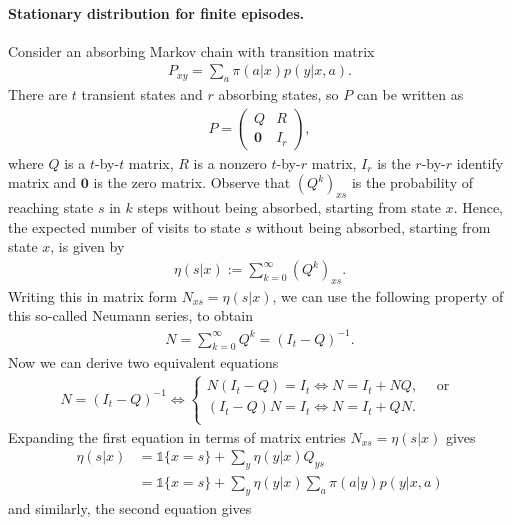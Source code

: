 \documentclass[a4paper]{report}
\theoremstyle{definition}
\theoremstyle{plain}
\begin{document}
\paragraph{Stationary distribution for finite episodes.}
Consider an absorbing Markov chain with transition matrix
\begin{align*}
  P_{xy} = \sum_{a} \pi(a | x) p(y | x, a) .
\end{align*}
There are $t$ transient states and $r$ absorbing states, so $P$ can be written
as
\begin{align*}
  P = \begin{pmatrix}
        Q & R \\
        \mathbf{0} & I_{r}
      \end{pmatrix} ,
\end{align*}
where $Q$ is a $t$-by-$t$ matrix, $R$ is a nonzero $t$-by-$r$ matrix, $I_{r}$ is
the $r$-by-$r$ identify matrix and $\mathbf{0}$ is the zero matrix.
%
Observe that $(Q^{k})_{xs}$ is the probability of reaching state $s$ in $k$
steps without being absorbed, starting from state $x$. Hence, the expected
number of visits to state $s$ without being absorbed, starting from state $x$,
is given by
\begin{align*}
  \eta(s | x) := \sum_{k=0}^{\infty} (Q^{k})_{xs} .
\end{align*}
%
Writing this in matrix form $N_{xs} = \eta(s | x)$, we can use the following
property of this so-called Neumann series, to obtain
\begin{align*}
  N = \sum_{k=0}^{\infty} Q^{k} = {(I_{t} - Q)}^{-1} .
\end{align*}
Now we can derive two equivalent equations
\begin{align*}
  N = (I_{t} - Q)^{-1} \iff
  \begin{cases}
    N (I_{t} - Q) = I_{t} \iff N = I_{t} + NQ ,
    \quad  \text{ or }  \\
    (I_{t} - Q) N = I_{t} \iff N = I_{t} + QN . \\
  \end{cases}
\end{align*}
%
Expanding the first equation in terms of matrix entries $N_{xs} = \eta(s | x)$
gives
\begin{align*}
  \eta(s | x) &= \mathds{1}\{ x = s \} + \sum_{y}  \eta(y | x) Q_{ys} \\
  &= \mathds{1}\{ x = s \} +  \sum_{y}\eta(y | x) \sum_{a} \pi(a | y) p(y | x, a)
\end{align*}
and similarly, the second equation gives
\end{document}
